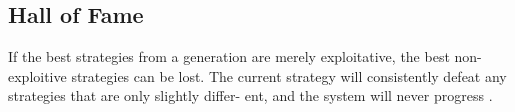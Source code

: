 \subsection{Hall of Fame}
If the best strategies from a generation are merely exploitative, the best non-exploitive strategies can be lost. The current strategy will consistently defeat any strategies that are only slightly differ- ent, and the system will never progress  \cite{evolutionary_methods}.
\pagebreak

%
